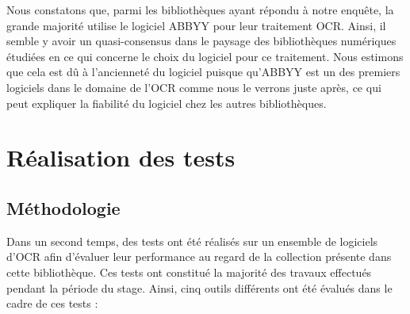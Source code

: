 \documentclass[a4paper,12pt,twoside]{book}
\begin{document}
	
	
	Nous constatons que, parmi les bibliothèques ayant répondu à notre
	enquête, la grande majorité utilise le logiciel ABBYY pour leur
	traitement OCR. Ainsi, il semble y avoir un quasi-consensus dans le
	paysage des bibliothèques numériques étudiées en ce qui concerne le
	choix du logiciel pour ce traitement. Nous estimons que cela est dû à
	l'ancienneté du logiciel puisque qu'ABBYY est un des premiers logiciels
	dans le domaine de l'OCR comme nous le verrons juste après, ce qui peut
	expliquer la fiabilité du logiciel chez les autres bibliothèques.
	
	\section{Réalisation des tests}
	
	\subsection{Méthodologie}
	
	Dans un second temps, des tests ont été réalisés sur un ensemble de
	logiciels d'OCR afin d'évaluer leur performance au regard de la
	collection présente dans cette bibliothèque. Ces tests ont constitué la
	majorité des travaux effectués pendant la période du stage. Ainsi, cinq
	outils différents ont été évalués dans le cadre de ces tests : \\
	
\end{document}
